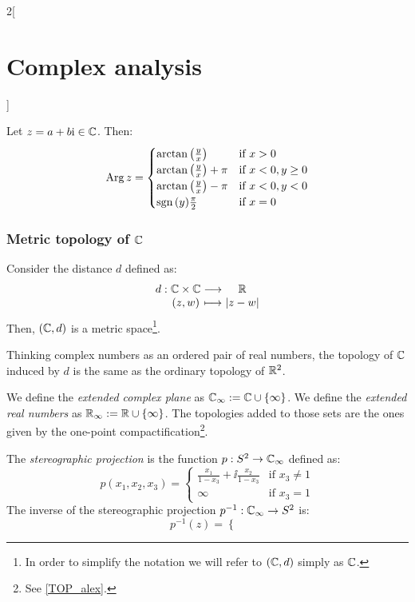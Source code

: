 \documentclass[../../../main.tex]{subfiles}
\begin{document}
\begin{multicols}{2}[\section{Complex analysis}]
\begin{definition}
  \end{definition}
  \begin{proposition}
    Let $z=a+b\ii\in\CC$. Then:
    $$\Arg z=
      \begin{cases}
        \arctan\left(\frac{y}{x}\right)     & \text{if }x>0         \\
        \arctan\left(\frac{y}{x}\right)+\pi & \text{if }x<0,y\geq 0 \\
        \arctan\left(\frac{y}{x}\right)-\pi & \text{if }x<0,y<0     \\
        \sign{(y)}\frac{\pi}{2}             & \text{if }x=0
      \end{cases}
    $$
  \end{proposition}
  \subsubsection{Metric topology of \texorpdfstring{$\CC$}{C}}
  \begin{proposition}
    Consider the distance $d$ defined as: $$\function{d}{\CC\times\CC}{\RR}{(z,w)}{\abs{z-w}}$$ Then, $(\CC,d)$ is a metric space\footnote{In order to simplify the notation we will refer to $(\CC,d)$ simply as $\CC$.}.
  \end{proposition}
  \begin{proposition}
    Thinking complex numbers as an ordered pair of real numbers, the topology of $\CC$ induced by $d$ is the same as the ordinary topology of $\RR^2$.
  \end{proposition}
  \begin{definition}
    We define the \emph{extended complex plane} as $\CC_\infty:=\CC\cup\{\infty\}$. We define the \emph{extended real numbers} as $\RR_\infty:=\RR\cup\{\infty\}$. The topologies added to those sets are the ones given by the one-point compactification\footnote{See \cref{TOP_alex}.}.
  \end{definition}
  \begin{definition}
    The \emph{stereographic projection} is the function $p:S^2\rightarrow\CC_\infty$ defined as:
    $$p(x_1,x_2,x_3)=
      \begin{cases}
        \frac{x_1}{1-x_3}+\ii\frac{x_2}{1-x_3} & \text{if }x_3\ne 1 \\
        \infty                                 & \text{if }x_3= 1
      \end{cases}$$
    The inverse of the stereographic projection $p^{-1}:\CC_\infty\rightarrow S^2$ is:
    $$p^{-1}(z)=
      \begin{cases}

\end{cases}$$
\end{definition}
\end{multicols}
\end{document}
